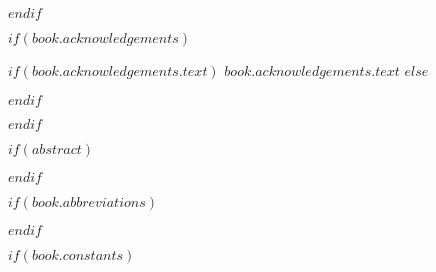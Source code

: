 $endif$

$if(book.acknowledgements)$

\begin{acknowledgements}
\begin{singlespace}
\addchaptertocentry{\acknowledgementname} %
$if(book.acknowledgements.text)$
$book.acknowledgements.text$
$else$

$endif$
\end{singlespace}
\end{acknowledgements}

$endif$

$if(abstract)$

\begin{abstract}
\begin{singlespace}
\addchaptertocentry{\abstractname} %
{$abstract$}\vspace{0.3cm}

{Palabras clave: }{\keywordnames}%
\end{singlespace}
\end{abstract}

$endif$


\tableofcontents %

\listoffigures %

\listoftables %

$if(book.abbreviations)$



$endif$

$if(book.constants)$


